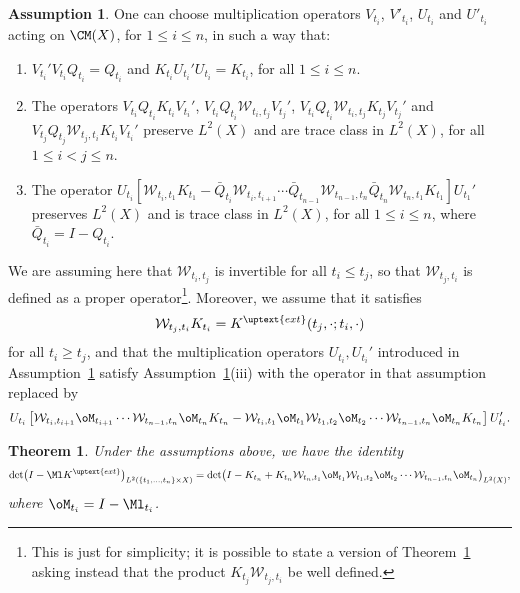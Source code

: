 \documentclass[]{pcmi}
\theoremstyle{plain}
\newtheorem{theorem}[equation]{Theorem}
\theoremstyle{definition}
\newtheorem{assumption}[equation]{Assumption}
\begin{document}
 \begin{assumption}\label{assum:3}
  One can choose multiplication operators $V_{t_i}$, $V'_{t_i}$, $U_{t_i}$ and $U'_{t_i}$
  acting on $\CM(X)$, for $1\leq i\leq n$, in such a way that:
  \begin{enumerate}[label=(\roman*)]
  \item $V_{t_i}'V_{t_i}Q_{t_i}=Q_{t_i}$  and $K_{t_i}U_{t_i}'U_{t_i}=K_{t_i}$, for all $1\leq i\leq n$.
  \item The operators $V_{t_i}Q_{t_i}K_{t_i}V_{t_i}'$, $V_{t_i}Q_{t_i}\mathcal{W}_{t_i,t_j}V_{t_j}'$,
    $V_{t_i}Q_{t_i}\mathcal{W}_{t_i,t_j}K_{t_j}V_{t_j}'$ and
    $V_{t_j}Q_{t_j}\mathcal{W}_{t_j,t_i}K_{t_i}V_{t_i}'$ preserve $L^2(X)$ and are trace class in $L^2(X)$, for all $1\leq i<j\leq n$.
  \item The operator
    $U_{t_{i}}\!\left[\mathcal{W}_{t_{i},t_1}K_{t_1}-\bar{Q}_{t_{i}}\mathcal{W}_{t_{i},t_{i+1}}\dotsm
      \bar{Q}_{t_{n-1}}\mathcal{W}_{t_{{n-1}},t_{n}}\bar{Q}_{t_{n}}\mathcal{W}_{t_{n},t_1}K_{t_1}\right]U_{t_1}'$ preserves
    $L^2(X)$ and is trace class in $L^2(X)$, for all $1\leq i\leq n$, where
    $\bar{Q}_{t_i}=I-Q_{t_i}$.
  \end{enumerate}
\end{assumption}

We are assuming here that $\mathcal{W}_{t_i,t_j}$ is invertible for all $t_i\leq t_j$, so that $\mathcal{W}_{t_j,t_i}$ is defined as a proper operator\footnote{This is just for simplicity; it is possible to state a version of Theorem~\ref{thm:alt-extendedToBVP} asking instead that the product $K_{t_j}\mathcal{W}_{t_j,t_i}$ be well defined.}.
Moreover, we assume that it satisfies
\begin{equation}
  \mathcal{W}_{t_j,t_i}K_{t_{i}}=K^\uptext{ext}(t_j,\cdot;t_i,\cdot)
\end{equation}
for all $t_i\geq t_j$, and that the multiplication operators $U_{t_i},U_{t_i}'$ introduced in Assumption~\ref{assum:3} satisfy Assumption~\ref{assum:3}(iii) with the operator in that assumption replaced by
\[U_{t_i}\left[\mathcal{W}_{t_{i},t_{i+1}}\oM_{t_{i+1}}
    \dotsm\mathcal{W}_{{t_{n-1}},{t_{n}}}\oM_{{t_{n}}}K_{t_n}-\mathcal{W}_{t_{i},{t_1}}\oM_{{t_1}}\mathcal{W}_{{t_1},{t_2}}\oM_{{t_2}}\dotsm\mathcal{W}_{{t_{n-1}},{t_{n}}}\oM_{{t_{n}}}K_{t_n}\right]U_{t_i}'.\]

\begin{theorem}\label{thm:alt-extendedToBVP}
  Under the assumptions above, we have the identity
  \begin{equation}
    \det\!\big(I-\Ml K^\uptext{ext}\big)_{L^2(\{t_1,\dots,t_n\}\times X)}
    =\det\!\big(I-K_{t_n}+K_{t_n}\mathcal{W}_{t_n,t_1}\oM_{t_1}\mathcal{W}_{t_1,t_2}\oM_{t_2}\dotsm\mathcal{W}_{t_{n-1},t_n}\oM_{t_n}\big)_{L^2(X)},
  \end{equation}
  where $\oM_{t_i}=I-\Ml_{t_i}$.
\end{theorem}
\end{document}
